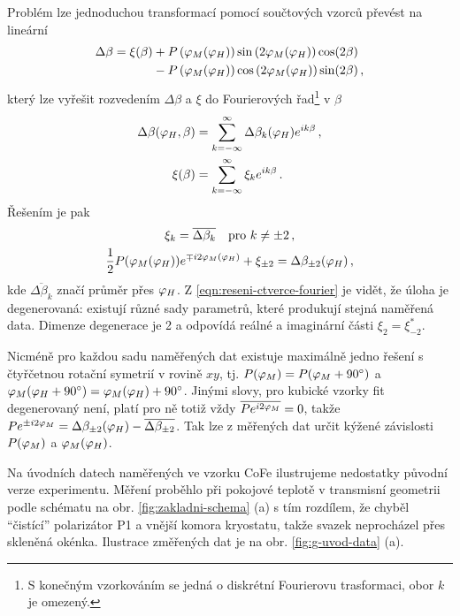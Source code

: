 Problém lze jednoduchou transformací pomocí součtových vzorců převést na lineární
\begin{equation}
\label{eqn:PMLD-linearizovane}
\begin{split}
\Delta\beta =\xi(\beta) &+ P\left(\varphi_M(\varphi_H)\right)\sin\left(2\varphi_M(\varphi_H)\right)\cos(2\beta) 
           \\&-P\left(\varphi_M(\varphi_H)\right)\cos\left(2\varphi_M(\varphi_H)\right)\sin(2\beta) \,,
\end{split}
\end{equation}
který lze vyřešit rozvedením $\Delta\beta$ a $\xi$ do Fourierových řad\footnote{S konečným vzorkováním se jedná o diskrétní Fourierovu trasformaci, obor $k$ je omezený.} v $\beta$
\begin{subequations}
\begin{align}
    \Delta\beta(\varphi_H, \beta) &= \sum_{k=-\infty}^\infty \Delta\beta_k(\varphi_H) e^{ik\beta} \,,\\
    \xi(\beta) &= \sum_{k=-\infty}^\infty \xi_k e^{ik\beta}  \,.
\end{align}
\end{subequations}
Řešením je pak
\begin{subequations}
\label{eqn:reseni-ctverce-fourier}
\begin{gather}
    \xi_k = \overline{\Delta\beta_{k}} \quad \textrm{pro} \,\, k\neq\pm2 \,,\\
    \frac{1}{2}P(\varphi_M(\varphi_H)) e^{\mp i2\varphi_M(\varphi_H)} + \xi_{\pm2} = \Delta\beta_{\pm2}(\varphi_H) \,,
\end{gather}
\end{subequations}
kde $\overline{\Delta\beta_k}$ značí průměr přes $\varphi_H$.
Z \eqref{eqn:reseni-ctverce-fourier} je vidět, že úloha je degenerovaná: existují různé sady parametrů, které produkují stejná naměřená data.
Dimenze degenerace je 2 a odpovídá reálné a imaginární části $\xi_2=\xi_{-2}^*$.

Nicméně pro každou sadu naměřených dat existuje maximálně jedno řešení s čtyřčetnou rotační symetrií v rovině $xy$, tj. $P(\varphi_M)=P(\varphi_M+\SI{90}{\degree})$ a $\varphi_M(\varphi_H+\SI{90}{\degree})=\varphi_M(\varphi_H)+\SI{90}{\degree}$.
Jinými slovy, pro kubické vzorky fit degenerovaný není, platí pro ně totiž vždy $\overline{Pe^{i2\varphi_M}}=0$, takže $Pe^{\pm i2\varphi_M}=\Delta\beta_{\pm2}(\varphi_H)-\overline{\Delta\beta_{\pm2}}$.
Tak lze z měřených dat určit kýžené závislosti $P(\varphi_M)$ a $\varphi_M(\varphi_H)$.

Na úvodních datech naměřených ve vzorku CoFe ilustrujeme nedostatky původní verze experimentu.
Měření proběhlo při pokojové teplotě v trans\-mis\-ní geometrii podle schématu na obr. \ref{fig:zakladni-schema} (a) s tím rozdílem, že chyběl ``čistící'' polarizátor P1 a vnější komora kryostatu, takže svazek neprocházel přes skleněná okénka.
Ilustrace změřených dat je na obr. \ref{fig:g-uvod-data} (a).


